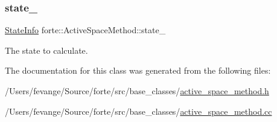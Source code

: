 \subsubsection{\texorpdfstring{state\+\_\+}{state\_}}
{\footnotesize\ttfamily \mbox{\hyperlink{classforte_1_1_state_info}{State\+Info}} forte\+::\+Active\+Space\+Method\+::state\+\_\+\hspace{0.3cm}{\ttfamily [protected]}}



The state to calculate. 



The documentation for this class was generated from the following files\+:\begin{DoxyCompactItemize}
\item 
/\+Users/fevange/\+Source/forte/src/base\+\_\+classes/\mbox{\hyperlink{active__space__method_8h}{active\+\_\+space\+\_\+method.\+h}}\item 
/\+Users/fevange/\+Source/forte/src/base\+\_\+classes/\mbox{\hyperlink{active__space__method_8cc}{active\+\_\+space\+\_\+method.\+cc}}\end{DoxyCompactItemize}
